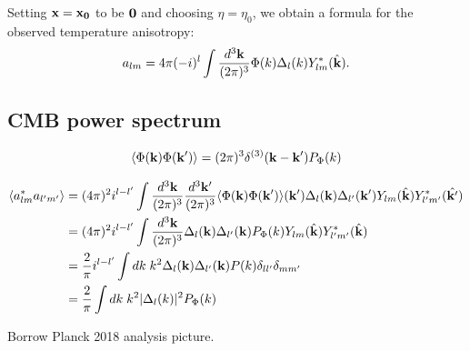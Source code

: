 Setting $\mathbf{x}=\mathbf{x_0}$ to be $\mathbf{0}$ and choosing $\eta=\eta_0$, we obtain a formula for the observed temperature anisotropy:
\begin{align}
	a_{lm} = 4\pi (-i)^l \int \frac{d^3\mathbf{k}}{(2\pi)^3} \Phi(k) \Delta_{l}(k) Y^*_{lm}(\hat{\mathbf{k}}).
\end{align}

\subsection{CMB power spectrum}

\begin{align}
	\langle \Phi (\mathbf{k}) \Phi (\mathbf{k}') \rangle = (2\pi)^3 \delta^{(3)} (\mathbf{k} - \mathbf{k}') P_\Phi (k)
\end{align}


\begin{align}
	\langle a^*_{lm} a_{l'm'} \rangle &= (4\pi)^2 i^{l-l'} \int \frac{d^3\mathbf{k}}{(2\pi)^3} \frac{d^3\mathbf{k'}}{(2\pi)^3} \langle \Phi (\mathbf{k}) \Phi (\mathbf{k}') \rangle (\mathbf{k}') \Delta_l (\mathbf{k}) \Delta_{l'} (\mathbf{k'}) Y_{lm}(\hat{\mathbf{k}}) Y^*_{l'm'}(\hat{\mathbf{k}'})  \\
	&= (4\pi)^2 i^{l-l'} \int \frac{d^3\mathbf{k}}{(2\pi)^3} \Delta_l (\mathbf{k}) \Delta_{l'} (\mathbf{k}) P_\Phi(k) Y_{lm}(\hat{\mathbf{k}}) Y^*_{l'm'}(\hat{\mathbf{k}}) \\
	&= \frac{2}{\pi} i^{l-l'} \int dk \; k^2  \Delta_l (\mathbf{k}) \Delta_{l'} (\mathbf{k}) P(k) \delta_{ll'} \delta_{mm'} \\
	&= \frac{2}{\pi} \int dk \; k^2 |\Delta_l(k)|^2 P_\Phi (k)
\end{align}


Borrow Planck 2018 analysis picture. 
